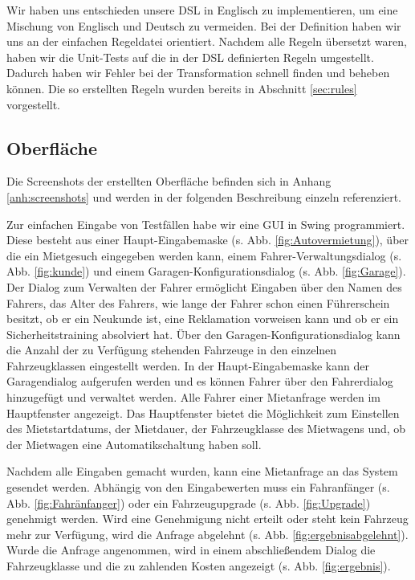 Wir haben uns entschieden unsere DSL in Englisch zu implementieren, um eine Mischung
von Englisch und Deutsch zu vermeiden. Bei der Definition haben wir uns an der
einfachen Regeldatei orientiert. Nachdem alle Regeln übersetzt waren, haben wir
die Unit-Tests auf die in der DSL definierten Regeln umgestellt. Dadurch haben wir
Fehler bei der Transformation schnell finden und beheben können. Die so erstellten
Regeln wurden bereits in Abschnitt \ref{sec:rules} vorgestellt.

\subsection{Oberfläche}
Die Screenshots der erstellten Oberfläche befinden sich in Anhang \ref{anh:screenshots} und werden
in der folgenden Beschreibung einzeln referenziert.

Zur einfachen Eingabe von Testfällen habe wir eine GUI in Swing programmiert.
Diese besteht aus einer Haupt-Eingabemaske (s. Abb. \ref{fig:Autovermietung}),
über die ein Mietgesuch eingegeben werden kann, einem Fahrer-Verwaltungsdialog  (s. Abb. \ref{fig:kunde})
und einem Garagen-Konfigurationsdialog (s. Abb. \ref{fig:Garage}).
Der Dialog zum Verwalten der Fahrer ermöglicht Eingaben über den Namen des Fahrers,
das Alter des Fahrers, wie lange der Fahrer schon einen Führerschein besitzt, 
ob er ein Neukunde ist, eine Reklamation vorweisen kann und ob er ein Sicherheitstraining absolviert hat.
Über den Garagen-Konfigurationsdialog kann die Anzahl der zu Verfügung stehenden Fahrzeuge in den einzelnen Fahrzeugklassen eingestellt werden. 
In der Haupt-Eingabemaske kann der Garagendialog aufgerufen werden und es können Fahrer über den Fahrerdialog hinzugefügt und verwaltet werden.
Alle Fahrer einer Mietanfrage werden im Hauptfenster angezeigt.
Das Hauptfenster bietet die Möglichkeit zum Einstellen des Mietstartdatums, der Mietdauer, der Fahrzeugklasse des Mietwagens und, ob der Mietwagen eine Automatikschaltung haben soll. 

Nachdem alle Eingaben gemacht wurden, kann eine Mietanfrage an das System gesendet werden. Abhängig von den Eingabewerten muss ein Fahranfänger  (s. Abb. \ref{fig:Fahränfanger}) oder ein Fahrzeugupgrade  (s. Abb. \ref{fig:Upgrade}) genehmigt werden. Wird eine Genehmigung nicht erteilt oder steht kein Fahrzeug mehr zur Verfügung, wird die Anfrage abgelehnt  (s. Abb. \ref{fig:ergebnisabgelehnt}).
Wurde die Anfrage angenommen, wird in einem abschließendem Dialog die Fahrzeugklasse und die zu zahlenden Kosten angezeigt  (s. Abb. \ref{fig:ergebnis}).

